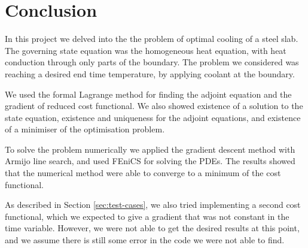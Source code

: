 \section{Conclusion}

In this project we delved into the the problem of optimal cooling of a steel slab. The governing state equation was the homogeneous heat equation, with heat conduction through only parts of the boundary. The problem we considered was reaching a desired end time temperature, by applying coolant at the boundary. 

We used the formal Lagrange method for finding the adjoint equation and the gradient of reduced cost functional. We also showed existence of a solution to the state equation,  existence and uniqueness for the adjoint equations, and existence of a minimiser of the optimisation problem.

To solve the problem numerically we applied the gradient descent method with Armijo line search, and used FEniCS for solving the PDEs. The results showed that the numerical method were able to converge to a minimum of the cost functional. 

As described in Section \ref{sec:test-cases}, we also tried implementing a second cost functional, which we expected to give a gradient that was not constant in the time variable. However, we were not able to get the desired results at this point, and we assume there is still some error in the code we were not able to find.
